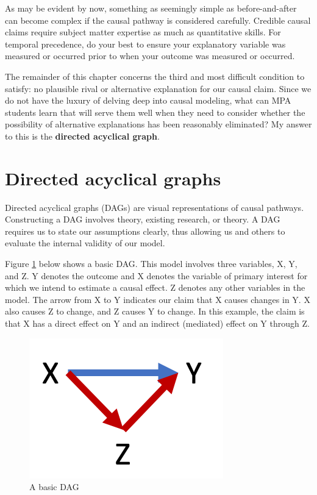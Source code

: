 \documentclass[
]{book}
\begin{document}
As may be evident by now, something as seemingly simple as before-and-after can become complex if the causal pathway is considered carefully. Credible causal claims require subject matter expertise as much as quantitative skills. For temporal precedence, do your best to ensure your explanatory variable was measured or occurred prior to when your outcome was measured or occurred.

The remainder of this chapter concerns the third and most difficult condition to satisfy: no plausible rival or alternative explanation for our causal claim. Since we do not have the luxury of delving deep into causal modeling, what can MPA students learn that will serve them well when they need to consider whether the possibility of alternative explanations has been reasonably eliminated? My answer to this is the \textbf{directed acyclical graph}.

\hypertarget{directed-acyclical-graphs}{%
\section{Directed acyclical graphs}\label{directed-acyclical-graphs}}

Directed acyclical graphs (DAGs) are visual representations of causal pathways. Constructing a DAG involves theory, existing research, or theory. A DAG requires us to state our assumptions clearly, thus allowing us and others to evaluate the internal validity of our model.

Figure \ref{fig:dagbasic} below shows a basic DAG. This model involves three variables, X, Y, and Z. Y denotes the outcome and X denotes the variable of primary interest for which we intend to estimate a causal effect. Z denotes any other variables in the model. The arrow from X to Y indicates our claim that X causes changes in Y. X also causes Z to change, and Z causes Y to change. In this example, the claim is that X has a direct effect on Y and an indirect (mediated) effect on Y through Z.

\begin{figure}

{\centering \includegraphics[width=\textwidth]{images/dag_basic} 

}

\caption{A basic DAG}\label{fig:dagbasic}
\end{figure}
\end{document}
